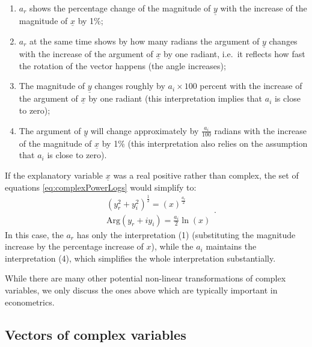 \documentclass[
]{book}
\providecommand{\tightlist}{%
  \setlength{\itemsep}{0pt}\setlength{\parskip}{0pt}}
\begin{document}
\begin{enumerate}
\def\labelenumi{\arabic{enumi}.}
\tightlist
\item
  \(a_r\) shows the percentage change of the magnitude of \(\underline{y}\) with the increase of the magnitude of \(\underline{x}\) by 1\%;
\item
  \(a_r\) at the same time shows by how many radians the argument of \(\underline{y}\) changes with the increase of the argument of \(\underline{x}\) by one radiant, i.e.~it reflects how fast the rotation of the vector happens (the angle increases);
\item
  The magnitude of \(\underline{y}\) changes roughly by \(a_i \times 100\) percent with the increase of the argument of \(\underline{x}\) by one radiant (this interpretation implies that \(a_i\) is close to zero);
\item
  The argument of \(\underline{y}\) will change approximately by \(\frac{a_i}{100}\) radians with the increase of the magnitude of \(\underline{x}\) by 1\% (this interpretation also relies on the assumption that \(a_i\) is close to zero).
\end{enumerate}

If the explanatory variable \(\underline{x}\) was a real positive rather than complex, the set of equations \eqref{eq:complexPowerLogs} would simplify to:
\begin{equation}
    \begin{aligned}
        & \left({y_r^2 + y_i^2}\right)^{\frac{1}{2}} = \left(x\right)^{\frac{a_{r}}{2}} \\
        & \mathrm{Arg}(y_r + i y_i) = \frac{a_{i}}{2} \ln \left(x\right)
    \end{aligned} .
    \label{eq:complexPowerLogsReal}
\end{equation}
In this case, the \(a_r\) has only the interpretation (1) (substituting the magnitude increase by the percentage increase of \(x\)), while the \(a_i\) maintains the interpretation (4), which simplifies the whole interpretation substantially.

While there are many other potential non-linear transformations of complex variables, we only discuss the ones above which are typically important in econometrics.

\hypertarget{vectorComplexVariables}{%
\subsection{Vectors of complex variables}\label{vectorComplexVariables}}
\end{document}
